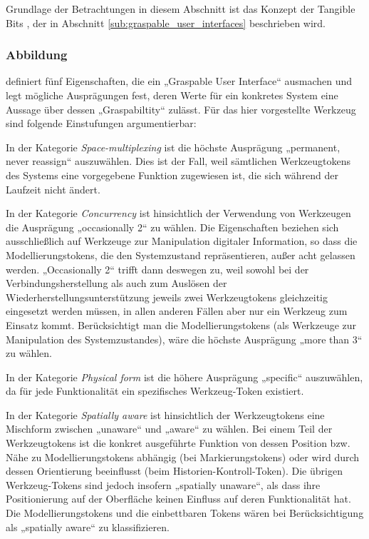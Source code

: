 Grundlage der Betrachtungen in diesem Abschnitt ist das Konzept der Tangible Bits \citep{Fitzmaurice96}, der in Abschnitt \ref{sub:graspable_user_interfaces} beschrieben wird.

\subsubsection{Abbildung}

\citet{Fitzmaurice96} definiert fünf Eigenschaften, die ein „Graspable User Interface“ ausmachen und legt mögliche Ausprägungen fest, deren Werte für ein konkretes System eine Aussage über dessen „Graspabiltity“ zulässt. Für das hier vorgestellte Werkzeug sind folgende Einstufungen argumentierbar:

In der Kategorie \emph{Space-multiplexing} ist die höchste Ausprägung „permanent, never reassign“ auszuwählen. Dies ist der Fall, weil sämtlichen Werkzeugtokens des Systems eine vorgegebene Funktion zugewiesen ist, die sich während der Laufzeit nicht ändert.

In der Kategorie \emph{Concurrency} ist hinsichtlich der Verwendung von Werkzeugen die Ausprägung „occasionally 2“ zu wählen. Die Eigenschaften beziehen sich ausschließlich auf Werkzeuge zur Manipulation digitaler Information, so dass die Modellierungstokens, die den Systemzustand repräsentieren, außer acht gelassen werden. „Occasionally 2“ trifft dann deswegen zu, weil sowohl bei der Verbindungsherstellung als auch zum Auslösen der Wiederherstellungsunterstützung jeweils zwei Werkzeugtokens gleichzeitig eingesetzt werden müssen, in allen anderen Fällen aber nur ein Werkzeug zum Einsatz kommt. Berücksichtigt man die Modellierungstokens (als Werkzeuge zur Manipulation des Systemzustandes), wäre die höchste Ausprägung „more than 3“ zu wählen.

In der Kategorie \emph{Physical form} ist die höhere Ausprägung „specific“ auszuwählen, da für jede Funktionalität ein spezifisches Werkzeug-Token existiert.

In der Kategorie \emph{Spatially aware} ist hinsichtlich der Werkzeugtokens eine Mischform zwischen „unaware“ und „aware“ zu wählen. Bei einem Teil der Werkzeugtokens ist die konkret ausgeführte Funktion von dessen Position bzw. Nähe zu Modellierungstokens abhängig (bei Markierungstokens) oder wird durch dessen Orientierung beeinflusst (beim Historien-Kontroll-Token). Die übrigen Werkzeug-Tokens sind jedoch insofern „spatially unaware“, als dass ihre Positionierung auf der Oberfläche keinen Einfluss auf deren Funktionalität hat. Die Modellierungstokens und die einbettbaren Tokens wären bei Berücksichtigung als „spatially aware“ zu klassifizieren.

